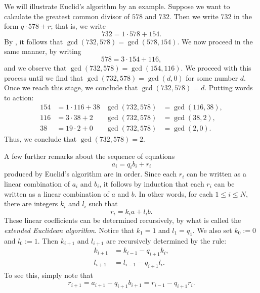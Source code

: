 \begin{example}
  We will illustrate Euclid's algorithm by an example. Suppose we want to calculate the greatest common divisor of $578$ and $732$. Then we write $732$ in the form $q\cdot 578+r$; that is, we write
  \begin{equation*}
    732 = 1 \cdot 578 + 154.
  \end{equation*}
  By , it follows that $\gcd(732,578)=\gcd(578,154)$. We now proceed in the same manner, by writing
  \begin{equation*}
    578 = 3\cdot 154 + 116, 
  \end{equation*}
  and we observe that $\gcd(732,578)=\gcd(154,116)$. We proceed with this process until we find that $\gcd(732,578)=\gcd(d,0)$ for some number $d$. Once we reach this stage, we conclude that $\gcd(732,578)=d$. Putting words to action:
  \begin{align*}
    154 & = 1\cdot 116 + 38 & \gcd(732,578) & = \gcd(116,38), \\
    116 & = 3 \cdot 38 + 2 & \gcd(732,578) & = \gcd(38,2), \\
    38 & = 19 \cdot 2 + 0 & \gcd(732,578) & = \gcd(2,0).
  \end{align*}
  Thus, we conclude that $\gcd(732,578)=2$.  
\end{example}

A few further remarks about the sequence of equations
\begin{equation*}
  a_i=q_ib_i+r_i
\end{equation*}
produced by Euclid's algorithm are in order. Since each $r_i$ can be written as a linear combination of $a_i$ and $b_i$, it follows by induction that each $r_i$ can be written as a linear combination of $a$ and $b$. In other words, for each $1\leq i\leq N$, there are integers $k_i$ and $l_i$ such that
\begin{equation*}
  r_i=k_ia+l_ib.
\end{equation*}
These linear coefficients can be determined recursively, by what is called the \emph{extended Euclidean algorithm}. Notice that $k_1=1$ and $l_1=q_1$. We also set $k_0:=0$ and $l_0:=1$. Then $k_{i+1}$ and $l_{i+1}$ are recursively determined by the rule:
\begin{align*}
  k_{i+1} & = k_{i-1}-q_{i+1}k_i, \\
  l_{i+1} & = l_{i-1}-q_{i+1}l_i.
\end{align*}
To see this, simply note that
\begin{equation*}
  r_{i+1}=a_{i+1}-q_{i+1}b_{i+1}=r_{i-1}-q_{i+1}r_i.
\end{equation*}


